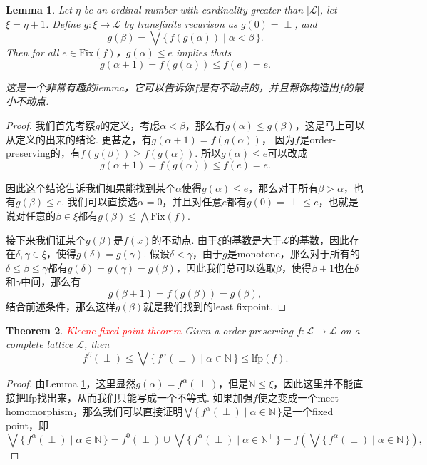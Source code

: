 \documentclass{article}
\newtheorem{theorem}{Theorem}[section]
\newtheorem{lemma}[theorem]{Lemma}
\newcommand*{\xfunc}[4]{{#2}\colon{#3}{#1}{#4}}
\newcommand*{\func}[3]{\xfunc{\to}{#1}{#2}{#3}}
\newcommand\Set[2]{\{\,#1\mid#2\,\}} %
\newcommand{\redt}[1]{\textcolor{red}{#1}}
\begin{document}
\begin{lemma}\label{lfp-construct}
\rm Let $\eta$ be an ordinal number with cardinality greater than $|\mathcal{L}|$, let $\xi = \eta + 1$. Define $\func{g}{\xi}{\mathcal{L}}$ by transfinite recurison as $g(0) = \perp$, and
$$
g(\beta) = \bigvee\Set{f(g(\alpha))}{\alpha < \beta}.
$$
Then for all $e \in \text{Fix}(f)$，$g(\alpha) \leq e$ implies thats
$$
g(\alpha + 1) = f(g(\alpha)) \leq f(e) = e.
$$ 

{\color{blue} 这是一个非常有趣的lemma，它可以告诉你$f$是有不动点的，并且帮你构造出$f$的最小不动点}.
\end{lemma}

\begin{proof}
我们首先考察$g$的定义，考虑$\alpha < \beta$，那么有$g(\alpha) \leq g(\beta)$，这是马上可以从定义的出来的结论. 更甚之，有$g(\alpha + 1) = f(g(\alpha))$， 因为$f$是order-preserving的，有$f(g(\beta)) \geq f(g(\alpha))$. 所以$g(\alpha) \leq e$可以改成
$$
g(\alpha + 1) = f(g(\alpha)) \leq f(e) = e.
$$

因此这个结论告诉我们如果能找到某个$\alpha$使得$g(\alpha) \leq e$，那么对于所有$\beta > \alpha$，也有$g(\beta) \leq e$. 我们可以直接选$\alpha = 0$，并且对任意$e$都有$g(0) = \perp \leq e$，也就是说对任意的$\beta \in \xi$都有$g(\beta) \leq \bigwedge\text{Fix}(f)$. 

接下来我们证某个$g(\beta)$是$f(x)$的不动点. 由于$\xi$的基数是大于$\mathcal{L}$的基数，因此存在$\delta,\gamma \in \xi$，使得$g(\delta) = g(\gamma)$. 假设$\delta < \gamma$，由于$g$是monotone，那么对于所有的$\delta \leq \beta \leq \gamma$都有$g(\delta) = g(\gamma) = g(\beta)$，因此我们总可以选取$\beta$，使得$\beta+1$也在$\delta$和$\gamma$中间，那么有
$$
g(\beta+1) = f(g(\beta)) = g(\beta),
$$
结合前述条件，那么这样$g(\beta)$就是我们找到的least fixpoint. 
\end{proof}

\begin{theorem}\label{Kleene-fp}
\rm \redt{Kleene fixed-point theorem} Given a order-preserving $\func{f}{\mathcal{L}}{\mathcal{L}}$ on a complete lattice $\mathcal{L}$, then 
$$
f^\beta(\perp) \leq \bigvee\Set{f^\alpha(\perp)}{\alpha \in \mathbb{N}} \leq \text{lfp}(f).
$$
\end{theorem}

\begin{proof}
\rm 由Lemma \ref{lfp-construct}，这里显然$g(\alpha) = f^\alpha(\perp)$，但是$\mathbb{N} \leq \xi$，因此这里并不能直接把lfp找出来，从而我们只能写成一个不等式. 如果加强$f$使之变成一个meet homomorphism，那么我们可以直接证明$\bigvee\Set{f^\alpha(\perp)}{\alpha \in \mathbb{N}}$是一个fixed point，即 
$$
\bigvee\Set{f^\alpha(\perp)}{\alpha \in \mathbb{N}} = f^0(\perp) \cup \bigvee\Set{f^\alpha(\perp)}{\alpha \in \mathbb{N}^+} = f\left(\bigvee\Set{f^\alpha(\perp)}{\alpha \in \mathbb{N}}\right),
$$
\end{proof}
\end{document}
